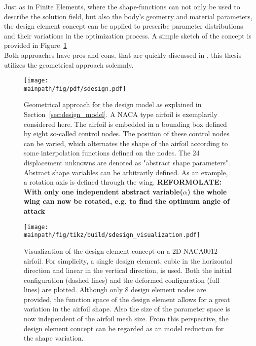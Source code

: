 \documentclass[../main.tex]{subfiles}
\begin{document}
Just as in Finite Elements, where the shape-functions can not only be used to describe the solution field, but also the body's geometry and material parameters, the design element concept can be applied to prescribe parameter distributions and their variations in the optimization process. A simple sketch of the concept is provided in Figure~\ref{fig:sketch_geometrical_approach}
\\
Both approaches have pros and cons, that are quickly discussed in \cite{Maute2003}, this thesis utilizes the geometrical approach solemnly.

\begin{figure}[h!]
	\begin{center}
        \texttt{[image: \\mainpath/fig/pdf/sdesign.pdf]}
        \caption[Design-model: geometrical approach]{Geometrical approach for the design model as explained in Section~\ref{sec:design_model}. A NACA type airfoil is exemplarily considered here. The airfoil is embedded in a bounding box defined by eight so-called control nodes. The position of these control nodes can be varied, which alternates the shape of the airfoil according to some interpolation functions defined on the nodes. The 24 displacement unknowns are denoted as "abstract shape parameters". Abstract shape variables can be arbitrarily defined. As an example, a rotation axis is defined through the wing. \textbf{REFORMOLATE: With only one independent abstract variable($\alpha$) the whole wing can now be rotated, e.g. to find the optimum angle of attack}}
		\label{fig:sketch_geometrical_approach}
    \end{center}
\end{figure}

\begin{figure}[h!]
	\begin{center}
        \texttt{[image: \\mainpath/fig/tikz/build/sdesign\_visualization.pdf]}
        \caption[Design element visualization]{Visualization of the design element concept on a 2D NACA0012 airfoil. For simplicity, a single design element, cubic in the horizontal direction and linear in the vertical direction, is used. Both the initial configuration (dashed lines) and the deformed configuration (full lines) are plotted. Although only 8 design element nodes are provided, the function space of the design element allows for a great variation in the airfoil shape. Also the size of the parameter space is now independent of the airfoil mesh size. From this perspective, the design element concept can be regarded as an model reduction for the shape variation.}
		\label{designelement_concept_2D}
    \end{center}
\end{figure}
\end{document}
